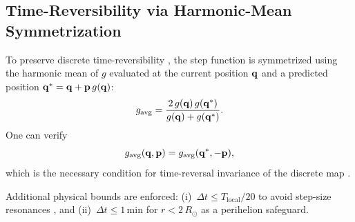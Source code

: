 \subsection{Time-Reversibility via Harmonic-Mean Symmetrization}
\label{sec:symmetrization}

To preserve discrete time-reversibility \citep{PretoTremaine1999,
HairerLubichWanner2006}, the step function is symmetrized using
the harmonic mean of $g$ evaluated at the current position
$\mathbf{q}$ and a predicted position $\mathbf{q}^* = \mathbf{q} + \mathbf{p}\,g(\mathbf{q})$:
\begin{equation}
  g_{\mathrm{avg}} =
    \frac{2\,g(\mathbf{q})\,g(\mathbf{q}^*)}{g(\mathbf{q}) + g(\mathbf{q}^*)}.
  \label{eq:harmonic_mean}
\end{equation}
One can verify
\begin{equation}
  g_{\mathrm{avg}}(\mathbf{q},\mathbf{p}) = g_{\mathrm{avg}}(\mathbf{q}^*,-\mathbf{p}),
\end{equation}
which is the necessary condition
for time-reversal invariance of the discrete map
\citep[\S\,VIII.6]{HairerLubichWanner2006}.

Additional physical bounds are enforced:
(i)~$\Delta t \leq T_{\mathrm{local}}/20$ to avoid step-size
resonances \citep{HernandezZeebeHadden2022}, and
(ii)~$\Delta t \leq 1\,\mathrm{min}$ for $r < 2\,R_\odot$
as a perihelion safeguard.

